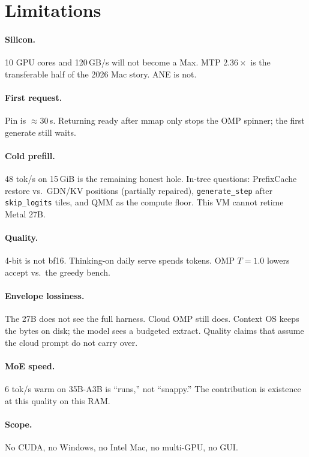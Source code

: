 \section{Limitations}
\label{sec:limit}

\paragraph{Silicon.} 10 GPU cores and 120\,GB/s will not become a Max. MTP $2.36\times$ is the transferable half of the 2026 Mac story. ANE is not.

\paragraph{First request.} Pin is $\approx 30$\,s. Returning ready after mmap only stops the OMP spinner; the first generate still waits.

\paragraph{Cold prefill.} 48 tok/s on 15\,GiB is the remaining honest hole. In-tree questions: PrefixCache restore vs.\ GDN/KV positions (partially repaired), \texttt{generate\_step} after \texttt{skip\_logits} tiles, and QMM as the compute floor. This VM cannot retime Metal 27B.

\paragraph{Quality.} 4-bit is not bf16. Thinking-on daily serve spends tokens. OMP $T{=}1.0$ lowers accept vs.\ the greedy bench.

\paragraph{Envelope lossiness.} The 27B does not see the full harness. Cloud OMP still does. Context OS keeps the bytes on disk; the model sees a budgeted extract. Quality claims that assume the cloud prompt do not carry over.

\paragraph{MoE speed.} 6 tok/s warm on 35B-A3B is ``runs,'' not ``snappy.'' The contribution is existence at this quality on this RAM.

\paragraph{Scope.} No CUDA, no Windows, no Intel Mac, no multi-GPU, no GUI.

